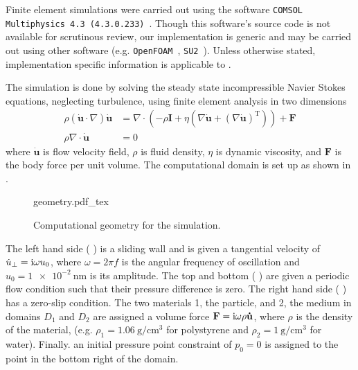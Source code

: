 Finite element simulations were carried out using the software
\texttt{COMSOL Multiphysics 4.3 (4.3.0.233)}~\cite{multiphysics1994comsol}.
Though this software's source code is not available for
scrutinous review, our implementation is generic and may be carried out
using other software (e.g. \texttt{OpenFOAM}~\cite{jasak2007openfoam},
\texttt{SU2}~\cite{palacios2013stanford}).  Unless otherwise stated,
implementation specific information is applicable to \comsol.

The simulation is done by solving the steady state incompressible Navier
Stokes equations, neglecting turbulence, using finite element analysis in
two dimensions
\begin{align}
 \rho\left(\mathbf{\dot{u}}\cdot \nabla\right)\mathbf{\dot{u}}
 &=\nabla \cdot \left( -\rho \mathbf{I} + \eta \left(\nabla \mathbf{\dot{u}} +
 \left( \nabla \mathbf{\dot{u}}\right)^\mathrm{T}\right)\right) + \mathbf{F}\\
 \rho \nabla \cdot \mathbf{\dot{u}} &= 0
\end{align}
where $\mathbf{\dot{u}}$ is flow velocity field, $\rho$ is fluid density,
$\eta$ is dynamic viscosity, and $\mathbf{F}$ is the body force per unit
volume.  The computational domain is set up as shown in
.  
\begin{figure}[h]
 \centering
 {geometry.pdf_tex}
 \caption{Computational geometry for the simulation.}
 \label{fig:compgeometry}
\end{figure}

The left hand side (
) %
is a sliding wall and is given a tangential velocity of $\dot{u}_\perp = {\mathrm{i}}
\omega u_0$, where $\omega=2\pi f$ is the angular frequency of oscillation
and $u_0=\SI{1e-2}{\nano\meter}$ is its amplitude.  The top and bottom
(%
%
) are given a periodic flow condition such that their pressure difference
is zero.  The right hand side (
) %
has a zero-slip condition.  The two materials 1, the particle, and 2, the
medium in domains $D_1$ and $D_2$ are assigned a volume force $\mathbf{F}={\mathrm{i}} \omega \rho
\mathbf{\dot{u}}$,
where $\rho$ is the density of the material, (e.g. $\rho_1 =
\SI{1.06}{\gram\per\centi\meter\cubed}$ for polystyrene and $\rho_2 =
\SI{1}{\gram\per\centi\meter\cubed}$ for water).  Finally. an initial pressure point
constraint of $p_0=0$ is assigned to the point in the bottom right of the
domain.  

